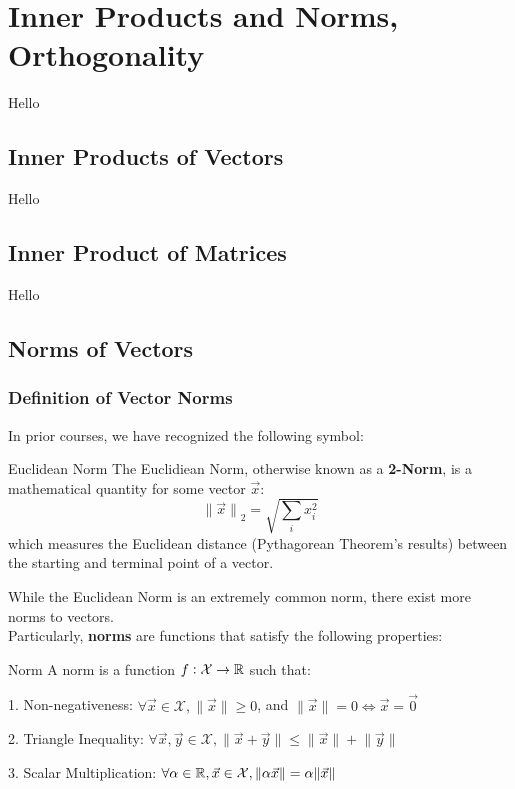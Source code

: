 \chapter{Inner Products and Norms, Orthogonality}
Hello

\section{Inner Products of Vectors}
Hello

\section{Inner Product of Matrices}
Hello

\section{Norms of Vectors}

\subsection{Definition of Vector Norms}
In prior courses, we have recognized the following symbol:
\begin{ln-symbol}{Euclidean Norm}{}
    The Euclidiean Norm, otherwise known as a \textbf{2-Norm}, is a mathematical quantity for some vector $\vec{x}$:
    \[
        {\lVert \vec{x} \rVert}_2 = \sqrt{\sum_i x_i^2}
    \]
    which measures the Euclidean distance (Pythagorean Theorem's results) between the starting and terminal point of a vector.
\end{ln-symbol}
While the Euclidean Norm is an extremely common norm, there exist more norms to vectors. \\
Particularly, \textbf{norms} are functions that satisfy the following properties:
\begin{ln-define}{Norm}{}
    A norm is a function $f: \mathcal{X} \rightarrow \mathbb{R}$ such that:
    \begin{bindenum}
        \item[1.] Non-negativeness: $\forall \vec{x} \in \mathcal{X}, \lVert \vec{x} \rVert \geq 0$, and $\lVert \vec{x} \rVert = 0 \iff \vec{x} = \vec{0}$
        \item[2.] Triangle Inequality: $\forall \vec{x}, \vec{y} \in \mathcal{X}, \lVert \vec{x} + \vec{y} \rVert \leq \lVert \vec{x} \rVert + \lVert \vec{y} \rVert$
        \item[3.] Scalar Multiplication: $\forall \alpha \in \mathbb{R}, \vec{x} \in \mathcal{X}, \lVert \alpha \vec{x} \rVert = \alpha \lVert \vec{x} \rVert$
    \end{bindenum}
\end{ln-define}


